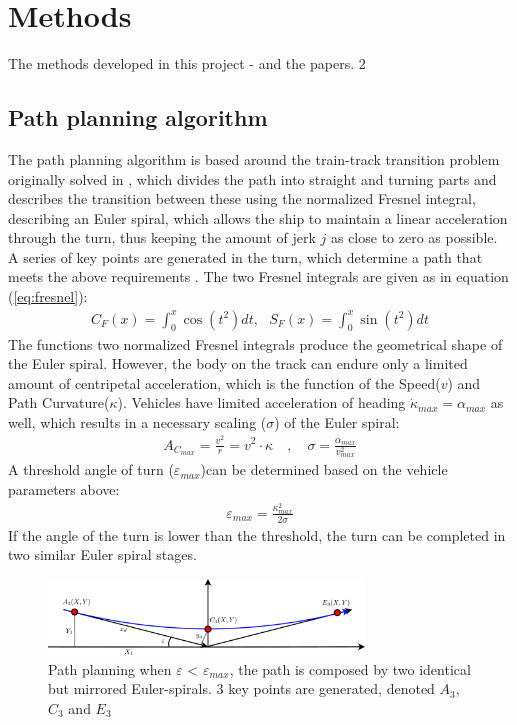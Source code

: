 \documentclass{ifacconf}
\begin{document}
\section{Methods}

The methods developed in this project - and the papers. 2

\subsection{Path planning algorithm}

The path planning algorithm is based around the train-track transition problem originally solved in \citep{Art:1}, which divides the path into straight and turning parts and describes the transition between these using the normalized Fresnel integral, describing an Euler spiral, which allows the ship to maintain a linear acceleration through the turn, thus keeping the amount of jerk $j$ as close to zero as possible. A series of key points are generated in the turn, which determine a path that meets the above requirements \citep{Art:2}. The two Fresnel integrals are given as in equation (\ref{eq:fresnel}):
\begin{align}
C_F(x) = \int_0^x \cos(t^2)dt,\,\,\,\,S_F(x) = \int_0^x \sin(t^2)dt
\label{eq:fresnel}
\end{align}
The functions two normalized Fresnel integrals produce the geometrical shape of the Euler spiral. However, the body on the track can endure only a limited amount of centripetal acceleration, which is the function of the Speed($v$) and Path Curvature($\kappa$). Vehicles have limited acceleration of heading $\dot{\kappa}_{max} = \alpha_{max}$ as well, which results in a necessary scaling ($\sigma$) of the Euler spiral:
\begin{align}
A_{C_{max}} = \frac{v^2}{r} = v^2 \cdot \kappa \quad , \quad \sigma = \frac{\alpha_{max}}{v^2_{max}}
\end{align}
A threshold angle of turn ($\varepsilon_{max}$)can be determined based on the vehicle parameters above:
\begin{align}
\varepsilon_{max} = \frac{\kappa^2_{max}}{2\sigma}
\end{align}
If the angle of the turn is lower than the threshold, the turn can be completed in two similar Euler spiral stages.
\begin{figure}
	\begin{center}
		\includegraphics[width=8.4cm]{img/3Points} %
		\caption{Path planning when $\varepsilon$ < $\varepsilon_{max}$, the path is composed by two identical but mirrored Euler-spirals. 3 key points are generated, denoted $A_3$, $C_3$ and $E_3$}
		\label{fig:3points}
	\end{center}
\end{figure}
\end{document}
